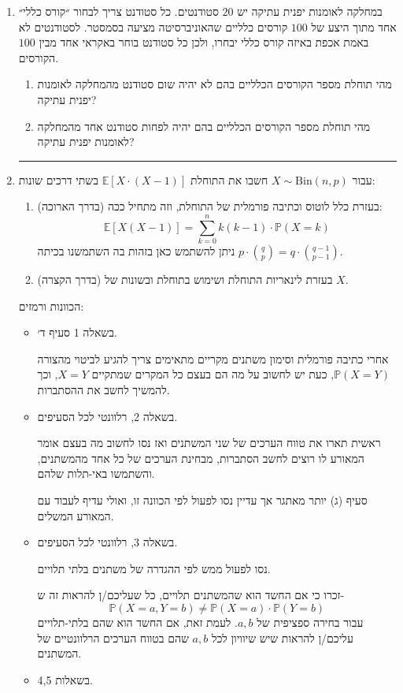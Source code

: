 \documentclass[12pt, a4paper]{article}
\newcommand{\EE}{\mathbb{E}}
\newcommand{\Bin}{\mathrm{Bin}}
\newcommand{\PP}{\mathbb{P}}
\begin{document}
\begin{enumerate}
\begin{enumerate}
\end{enumerate}
\noindent\rule{15cm}{0.4pt}


\item
במחלקה לאומנות יפנית עתיקה יש
$20$
סטודנטים. כל סטודנט צריך לבחור ״קורס כללי״ אחד מתוך היצע של
$100$
קורסים כלליים שהאוניברסיטה מציעה בסמסטר.
לסטודנטים לא באמת אכפת באיזה קורס כללי יבחרו, ולכן כל סטודנט בוחר באקראי אחד מבין
$100$
הקורסים.
\begin{enumerate}
\item
מהי תוחלת מספר הקורסים הכלליים בהם לא יהיה שום סטודנט מהמחלקה לאומנות יפנית עתיקה?
\item
מהי תוחלת מספר הקורסים הכלליים בהם יהיה לפחות סטודנט אחד מהמחלקה לאומנות יפנית עתיקה?
\end{enumerate}

\noindent\rule{15cm}{0.4pt}

\item
עבור
$X\sim \Bin(n,p)$
חשבו את התוחלת
$\EE[X\cdot(X-1)]$
 בשתי דרכים שונות:
 \begin{enumerate}
 \item
 (בדרך הארוכה) בעזרת כלל לוטוס וכתיבה פורמלית של התוחלת, וזה מתחיל ככה:
 $$\EE[X(X-1)]
 =\sum_{k=0}^n
 k(k-1)
 \cdot
 \PP(X=k)$$
 ניתן להשתמש כאן בזהות בה השתמשנו בכיתה
 $p\cdot
 \binom{q}{p}
 =q\cdot \binom{q-1}{p-1}$.
 \item
 (בדרך הקצרה) בעזרת לינאריות התוחלת ושימוש בתוחלת ובשונות של
 $X$.
 \end{enumerate}

\newpage

הכוונות ורמזים:
\begin{itemize}
\item
בשאלה 1 סעיף ד׳.

אחרי כתיבה פורמלית וסימון משתנים מקריים מתאימים צריך להגיע לביטוי מהצורה
$\PP(X=Y)$,
כעת יש לחשוב על מה הם בעצם כל המקרים שמתקיים
$X=Y$,
וכך להמשיך לחשב את ההסתברות.
\item
בשאלה 2, רלוונטי לכל הסעיפים.

ראשית תארו את טווח הערכים של שני המשתנים ואז נסו לחשוב מה בעצם אומר המאורע לו רוצים לחשב הסתברות, מבחינת הערכים של כל אחד מהמשתנים, והשתמשו באי-תלות שלהם.

סעיף (ג) יותר מאתגר אך עדיין נסו לפעול לפי הכוונה זו, ואולי עדיף לעבוד עם המאורע המשלים. 
\item
בשאלה 3, רלוונטי לכל הסעיפים.

נסו לפעול ממש לפי ההגדרה של משתנים בלתי תלויים. 

זכרו כי אם החשד הוא שהמשתנים תלויים, כל שעליכם/ן להראות זה ש-
$$\PP(X=a, Y=b)\neq \PP(X=a)\cdot \PP(Y=b)$$
עבור בחירה ספציפית של
$a,b$.
לעמת זאת, אם החשד הוא שהם בלתי-תלויים עליכם/ן להראות שיש שיוויון לכל
$a,b$
שהם בטווח הערכים הרלוונטיים של המשתנים.
\item
בשאלות 4,5.


\end{itemize}
\end{enumerate}
\end{document}
